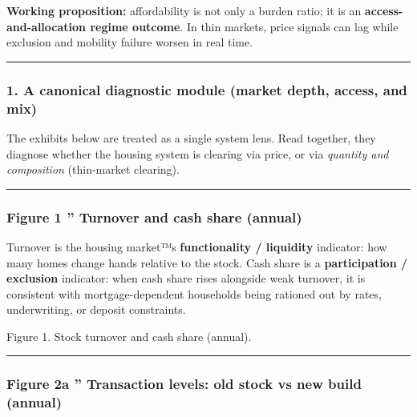 \documentclass[
]{article}
\begin{document}
\textbf{Working proposition:} affordability is not only a burden ratio;
it is an \textbf{access-and-allocation regime outcome}. In thin markets,
price signals can lag while exclusion and mobility failure worsen in
real time.

\begin{center}\rule{0.5\linewidth}{0.5pt}\end{center}

\protect{}\label{part1-exhibits}
\subsubsection{1. A canonical diagnostic module (market depth, access,
and
mix)}\label{a-canonical-diagnostic-module-market-depth-access-and-mix}

The exhibits below are treated as a single system lens. Read together,
they diagnose whether the housing system is clearing via price, or via
\emph{quantity and composition} (thin-market clearing).

\begin{center}\rule{0.5\linewidth}{0.5pt}\end{center}

\protect{}\label{part1-fig1}
\subsubsection{Figure 1 '' Turnover and cash share
(annual)}\label{figure-1-turnover-and-cash-share-annual}

Turnover is the housing market™s \textbf{functionality / liquidity}
indicator: how many homes change hands relative to the stock. Cash share
is a \textbf{participation / exclusion} indicator: when cash share rises
alongside weak turnover, it is consistent with mortgage-dependent
households being rationed out by rates, underwriting, or deposit
constraints.

Figure 1. Stock turnover and cash share (annual).

\begin{center}\rule{0.5\linewidth}{0.5pt}\end{center}

\protect{}\label{part1-fig2a}
\subsubsection{Figure 2a '' Transaction levels: old stock vs new build
(annual)}\label{figure-2a-transaction-levels-old-stock-vs-new-build-annual}
\end{document}
